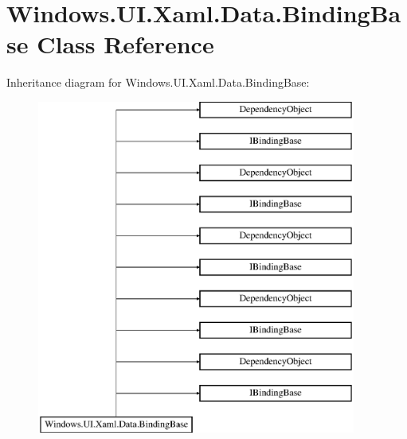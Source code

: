 \hypertarget{class_windows_1_1_u_i_1_1_xaml_1_1_data_1_1_binding_base}{}\section{Windows.\+U\+I.\+Xaml.\+Data.\+Binding\+Base Class Reference}
\label{class_windows_1_1_u_i_1_1_xaml_1_1_data_1_1_binding_base}
Inheritance diagram for Windows.\+U\+I.\+Xaml.\+Data.\+Binding\+Base\+:\begin{figure}[H]
\begin{center}
\leavevmode
\includegraphics[height=11.000000cm]{class_windows_1_1_u_i_1_1_xaml_1_1_data_1_1_binding_base}
\end{center}
\end{figure}
